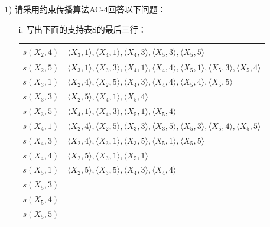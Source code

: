 \documentclass{article}
\begin{document}
\begin{enumerate}
    \item[1)] 请采用约束传播算法AC-4回答以下问题：
    \begin{enumerate}
        
    \item[i.] 写出下面的支持表S的最后三行：
        \begin{center}
            \begin{longtable}{|l|l|}
            \hline
            \endfirsthead
            \hline
            \endhead
            \hline
            \endfoot
            \hline
            \endlastfoot
            $s(X_2,4)$ & $\langle X_3,1 \rangle, \langle X_4,1 \rangle, \langle X_4,3 \rangle, \langle X_5,3 \rangle, \langle X_5,5 \rangle$ \\ \hline
            $s(X_2,5)$ & $\langle X_3,1 \rangle, \langle X_3,3 \rangle, \langle X_4,1 \rangle, \langle X_4,4 \rangle, \langle X_5,1 \rangle, \langle X_5,3 \rangle, \langle X_5,4 \rangle$ \\ \hline
            $s(X_3,1)$ & $\langle X_2,4 \rangle, \langle X_2,5 \rangle, \langle X_4,3 \rangle, \langle X_4,4 \rangle, \langle X_5,4 \rangle, \langle X_5,5 \rangle$ \\ \hline
            $s(X_3,3)$ & $\langle X_2,5 \rangle, \langle X_4,1 \rangle, \langle X_5,4 \rangle$ \\ \hline
            $s(X_3,5)$ & $\langle X_4,1 \rangle, \langle X_4,3 \rangle, \langle X_5,1 \rangle, \langle X_5,4 \rangle$ \\ \hline
            $s(X_4,1)$ & $\langle X_2,4 \rangle, \langle X_2,5 \rangle, \langle X_3,3 \rangle, \langle X_3,5 \rangle, \langle X_5,3 \rangle, \langle X_5,4 \rangle, \langle X_5,5 \rangle$ \\ \hline
            $s(X_4,3)$ & $\langle X_2,4 \rangle, \langle X_3,1 \rangle, \langle X_3,5 \rangle, \langle X_5,1 \rangle, \langle X_5,5 \rangle$ \\ \hline
            $s(X_4,4)$ & $\langle X_2,5 \rangle, \langle X_3,1 \rangle, \langle X_5,1 \rangle$ \\ \hline
            $s(X_5,1)$ & $\langle X_2,5 \rangle, \langle X_3,5 \rangle, \langle X_4,3 \rangle, \langle X_4,4 \rangle$ \\ \hline
            $s(X_5,3)$ &  \\ \hline
            $s(X_5,4)$ &  \\ \hline
            $s(X_5,5)$ &  \\ \hline
            \end{longtable}
        \end{center}


\end{enumerate}
\end{enumerate}
\end{document}
